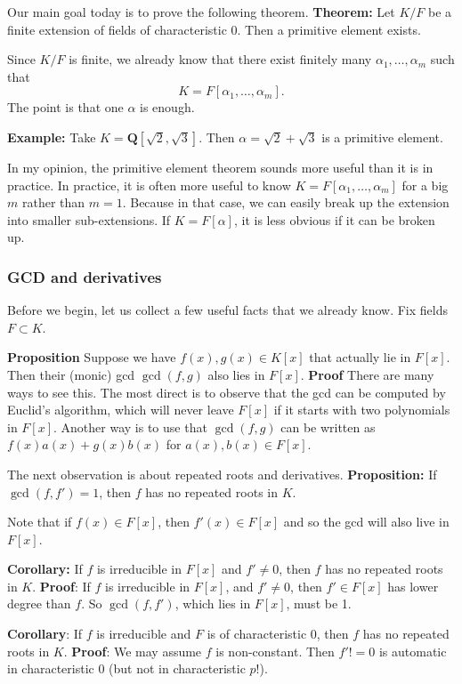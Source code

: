 \documentclass[11pt]{article}
\begin{document}
Our main goal today is to prove the following theorem.
\textbf{\textbf{Theorem:}} Let \(K/F\) be a finite extension of fields of characteristic 0.  Then a primitive element exists.

Since \(K/F\) is finite, we already know that there exist finitely many \(\alpha_1, \dots, \alpha_{m}\) such that
\[ K = F[\alpha_1, \dots, \alpha_m].\]
The point is that one \(\alpha\) is enough.

\textbf{\textbf{Example:}} Take \(K = \mathbf{Q}[\sqrt 2, \sqrt 3]\).  Then \(\alpha = \sqrt 2 + \sqrt 3\) is a primitive element.

In my opinion, the primitive element theorem sounds more useful than it is in practice.
In practice, it is often more useful to know \(K = F[\alpha_1, \dots, \alpha_m]\) for a big \(m\) rather than \(m = 1\).
Because in that case, we can easily break up the extension into smaller sub-extensions. 
If \(K = F[\alpha]\), it is less obvious if it can be broken up.
\subsubsection{GCD and derivatives}
\label{sec:org1ddc07f}
Before we begin, let us collect a few useful facts that we already know.
Fix fields \(F \subset K\).

\textbf{\textbf{Proposition}} Suppose we have \(f(x), g(x) \in K[x]\) that actually lie in \(F[x]\).
Then their (monic) gcd \(\gcd(f,g)\) also lies in \(F[x]\).
\textbf{\textbf{Proof}} There are many ways to see this.  The most direct is to observe that the gcd can be computed by Euclid's algorithm, which will never leave \(F[x]\) if it starts with two polynomials in \(F[x]\).
Another way is to use that \(\gcd(f,g)\) can be written as \(f(x) a(x) + g(x) b(x)\) for \(a(x), b(x) \in F[x]\).

The next observation is about repeated roots and derivatives.
\textbf{\textbf{Proposition:}} If \(\gcd(f, f') = 1\), then \(f\) has no repeated roots in \(K\).

Note that if \(f(x) \in F[x]\), then \(f'(x) \in F[x]\) and so the gcd will also live in \(F[x]\).

\textbf{\textbf{Corollary:}} If \(f\) is irreducible in \(F[x]\) and \(f' \neq 0\), then \(f\) has no repeated roots in \(K\).
\textbf{\textbf{Proof}}: If \(f\) is irreducible in \(F[x]\), and \(f' \neq 0\), then \(f' \in F[x]\) has lower degree than \(f\).
So \(\gcd(f,f')\), which lies in \(F[x]\), must be 1.

\textbf{\textbf{Corollary}}: If \(f\) is irreducible and \(F\) is of characteristic 0, then \(f\) has no repeated roots in \(K\).
\textbf{\textbf{Proof}}: We may assume \(f\) is non-constant.  Then \(f' != 0\) is automatic in characteristic 0 (but not in characteristic \(p\)!).
\end{document}

